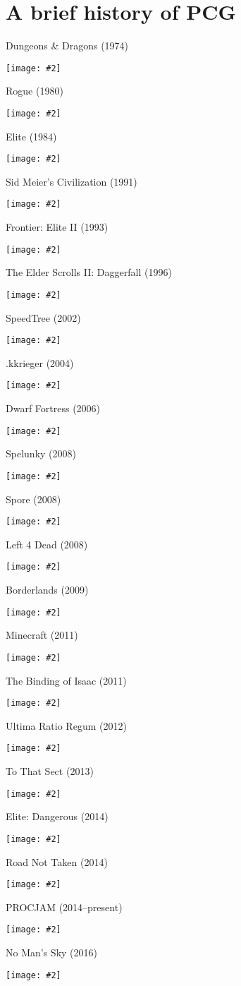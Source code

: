 \part{A brief history of PCG}
\frame{\partpage}

\newcommand{\pictureslideb}[3]{
	\begin{frame}{#1}
		\begin{center}
			#3
			
			\vspace{6pt}
			
			\texttt{[image: \#2]}
		\end{center}
	\end{frame}
}

\newcommand{\pictureslide}[2]{
	\begin{frame}{#1}
		\begin{center}
			\texttt{[image: \#2]}
		\end{center}
	\end{frame}
}

\newcommand{\pictureslidew}[2]{
	\begin{frame}{#1}
		\begin{center}
			\texttt{[image: \#2]}
		\end{center}
	\end{frame}
}

\pictureslide{Dungeons \& Dragons (1974)}{dnd}
\pictureslide{Rogue (1980)}{rogue}
\pictureslide{Elite (1984)}{elite} %
\pictureslide{Sid Meier's Civilization (1991)}{civilization}
\pictureslide{Frontier: Elite II (1993)}{frontier} 
\pictureslide{The Elder Scrolls II: Daggerfall (1996)}{daggerfall} %
\pictureslide{SpeedTree (2002)}{speedtree}
\pictureslide{.kkrieger (2004)}{kkrieger} %
\pictureslide{Dwarf Fortress (2006)}{dwarffortress}
\pictureslide{Spelunky (2008)}{spelunky}
\pictureslide{Spore (2008)}{spore}
\pictureslide{Left 4 Dead (2008)}{left4dead}
\pictureslide{Borderlands (2009)}{borderlands}
\pictureslide{Minecraft (2011)}{minecraft} %
\pictureslide{The Binding of Isaac (2011)}{isaac}
\pictureslide{Ultima Ratio Regum (2012)}{ultimaratioregum}
\pictureslide{To That Sect (2013)}{tothatsect}
\pictureslide{Elite: Dangerous (2014)}{elitedangerous}
\pictureslide{Road Not Taken (2014)}{roadnottaken}
\pictureslidew{PROCJAM (2014--present)}{procjam}
\pictureslide{No Man's Sky (2016)}{nomanssky}
